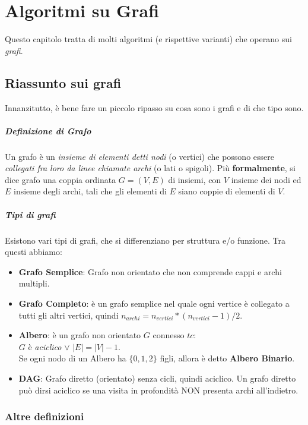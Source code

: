 \chapter{Algoritmi su Grafi}
Questo capitolo tratta di molti algoritmi (e rispettive varianti) che operano sui \emph{grafi}.

\section{Riassunto sui grafi}
Innanzitutto, è bene fare un piccolo ripasso su cosa sono i grafi e di che tipo sono.

\paragraph{Definizione di Grafo} Un grafo è un \emph{insieme di elementi detti nodi} (o vertici) che possono essere \emph{collegati fra loro da linee chiamate archi} (o lati o spigoli).
Più \textbf{formalmente}, si dice grafo una coppia ordinata $G=(V,E)$ di insiemi, con $V$ insieme dei nodi ed $E$ insieme degli archi, tali che gli elementi di $E$ siano coppie di elementi di $V$.

\paragraph{Tipi di grafi} Esistono vari tipi di grafi, che si differenziano per struttura e/o funzione.
Tra questi abbiamo:
\begin{itemize}
	\item \textbf{Grafo Semplice}: Grafo non orientato che non comprende cappi e archi multipli.
	\item \textbf{Grafo Completo}: è un grafo semplice nel quale ogni vertice è collegato a tutti gli altri vertici, quindi $n_{archi} = n_{vertici} * (n_{vertici} - 1)/2$.
	\item \textbf{Albero}: è un grafo non orientato $G$ connesso $tc$:
		\\$G$ è \emph{aciclico} $\vee$ $|E| = |V| - 1$.
		\\Se ogni nodo di un Albero ha  $\{0,1,2\}$ figli, allora è detto \textbf{Albero Binario}.
	\item \textbf{DAG}: Grafo diretto (orientato) senza cicli, quindi aciclico.
			Un grafo diretto può dirsi aciclico se una visita in profondità NON presenta archi all'indietro.
\end{itemize}

\subsection*{Altre definizioni}
